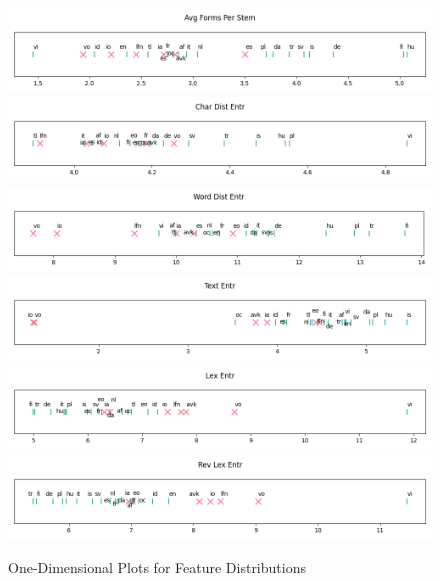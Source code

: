 \documentclass[12pt,a4paper]{article}
\numberwithin{figure}{section}
\numberwithin{table}{section}
\numberwithin{definition}{section}
\begin{document}
\clearpage

\begin{figure}[!ht]
  \centering
  \includegraphics[width=\textwidth]{1d_Avg_Forms_Per_Stem.png} 
  \includegraphics[width=\textwidth]{1d_Char_Dist_Entr.png}
  \includegraphics[width=\textwidth]{1d_Word_Dist_Entr.png}
  \includegraphics[width=\textwidth]{1d_Text_Entr.png}
  \includegraphics[width=\textwidth]{1d_Lex_Entr.png}
  \includegraphics[width=\textwidth]{1d_Rev_Lex_Entr.png}
  \caption{One-Dimensional Plots for Feature Distributions}
  \label{fig:1dfeatures}
\end{figure}
\end{document}
